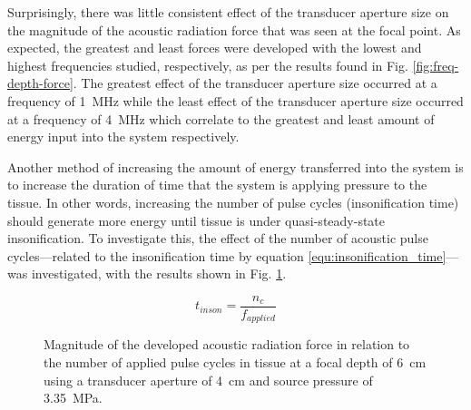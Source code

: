 			Surprisingly, there was little consistent effect of the transducer aperture size on the magnitude of the acoustic radiation force that was seen at the focal point. As expected, the greatest and least forces were developed with the lowest and highest frequencies studied, respectively, as per the results found in Fig. \ref{fig:freq-depth-force}. The greatest effect of the transducer aperture size occurred at a frequency of \SI{1}{\MHz} while the least effect of the transducer aperture size occurred at a frequency of \SI{4}{\MHz} which correlate to the greatest and least amount of energy input into the system respectively.

			Another method of increasing the amount of energy transferred into the system is to increase the duration of time that the system is applying pressure to the tissue. In other words, increasing the number of pulse cycles (insonification time) should generate more energy until tissue is under quasi-steady-state insonification. To investigate this, the effect of the number of acoustic pulse cycles---related to the insonification time by equation \ref{equ:insonification_time}---was investigated, with the results shown in Fig. \ref{fig:pulse_cycles_force}.

			\begin{equation}
			\label{equ:insonification_time}
				t_{inson} = \frac{n_c}{f_{applied}}
			\end{equation}

			\begin{figure}[!htb]
				\centering
				\caption[Magnitude of developed acoustic radiation force in relation to the number of applied pulse cycles]{Magnitude of the developed acoustic radiation force in relation to the number of applied pulse cycles in tissue at a focal depth of \SI{6}{\cm} using a transducer aperture of \SI{4}{\cm} and source pressure of \SI{3.35}{\MPa}.}
				\label{fig:pulse_cycles_force}
			\end{figure}

